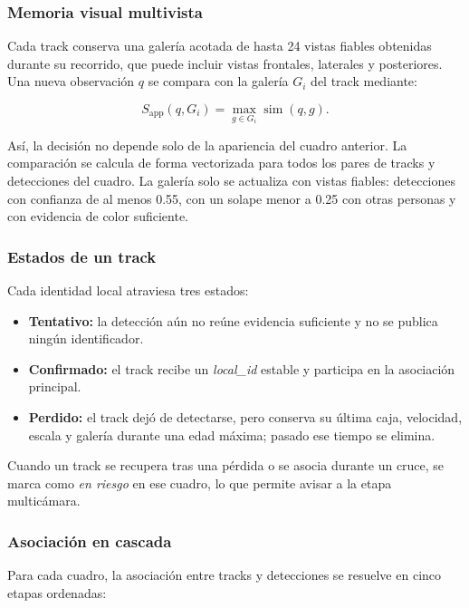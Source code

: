 \documentclass[12pt,a4paper]{article}
\begin{document}
\subsubsection{Memoria visual multivista}

Cada track conserva una galería acotada de hasta 24 vistas fiables
obtenidas durante su recorrido, que puede incluir vistas frontales,
laterales y posteriores. Una nueva observación $q$ se compara con la
galería $G_i$ del track mediante:

\begin{equation}
S_{\text{app}}(q,G_i)=
\max_{g \in G_i}
\operatorname{sim}(q,g).
\end{equation}

Así, la decisión no depende solo de la apariencia del cuadro anterior. La
comparación se calcula de forma vectorizada para todos los pares de
tracks y detecciones del cuadro. La galería solo se actualiza con vistas
fiables: detecciones con confianza de al menos 0.55, con un solape menor
a 0.25 con otras personas y con evidencia de color suficiente.

\subsubsection{Estados de un track}

Cada identidad local atraviesa tres estados:

\begin{itemize}
    \item \textbf{Tentativo:} la detección aún no reúne evidencia
    suficiente y no se publica ningún identificador.
    \item \textbf{Confirmado:} el track recibe un \textit{local\_id}
    estable y participa en la asociación principal.
    \item \textbf{Perdido:} el track dejó de detectarse, pero conserva su
    última caja, velocidad, escala y galería durante una edad máxima;
    pasado ese tiempo se elimina.
\end{itemize}

Cuando un track se recupera tras una pérdida o se asocia durante un
cruce, se marca como \textit{en riesgo} en ese cuadro, lo que permite
avisar a la etapa multicámara.

\subsubsection{Asociación en cascada}

Para cada cuadro, la asociación entre tracks y detecciones se resuelve en
cinco etapas ordenadas:
\end{document}
